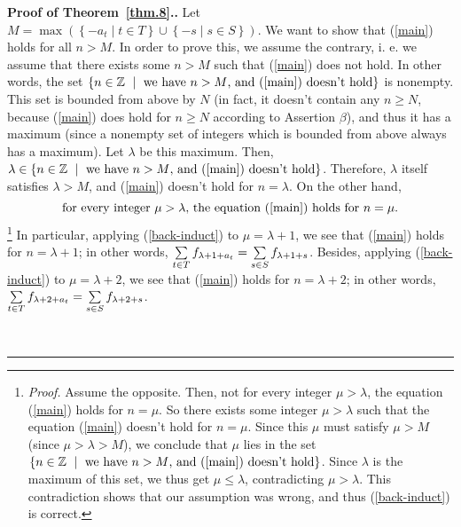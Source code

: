 \documentclass[numbers=enddot,12pt,final,onecolumn,notitlepage]{scrartcl}%
\numberwithin{exer}{section}
\theoremstyle{definition}
\newenvironment{proof}[1][Proof]{\noindent\textbf{#1.} }{\ \rule{0.5em}{0.5em}}
\let\sumnonlimits\sum
\renewcommand{\sum}{\sumnonlimits\limits}
\begin{document}
\begin{proof}[Proof of Theorem~\ref{thm.8}.]
Let $M=\max\left(  \left\{  -a_{t}\mid t\in T\right\}  \cup\left\{  -s\mid
s\in S\right\}  \right)  $. We want to show that (\ref{main}) holds for all
$n>M$. In order to prove this, we assume the contrary, i. e. we assume that
there exists some $n>M$ such that (\ref{main}) does not hold. In other words,
the set $\left\{  n\in\mathbb{Z}\ \mid\ \text{we have }n>M\text{, and
(\ref{main}) doesn't hold}\right\}  $ is nonempty. This set is bounded from
above by $N$ (in fact, it doesn't contain any $n\geq N$, because (\ref{main})
does hold for $n\geq N$ according to Assertion $\beta$), and thus it has a
maximum (since a nonempty set of integers which is bounded from above always
has a maximum). Let $\lambda$ be this maximum. Then, $\lambda\in\left\{
n\in\mathbb{Z}\ \mid\ \text{we have }n>M\text{, and (\ref{main}) doesn't
hold}\right\}  $. Therefore, $\lambda$ itself satisfies $\lambda>M$, and
(\ref{main}) doesn't hold for $n=\lambda$. On the other hand,%
\begin{equation}
\text{for every integer }\mu>\lambda\text{, the equation (\ref{main}) holds
for }n=\mu. \label{back-induct}%
\end{equation}
\footnote{\textit{Proof.} Assume the opposite. Then, not for every integer
$\mu>\lambda$, the equation (\ref{main}) holds for $n=\mu$. So there exists
some integer $\mu>\lambda$ such that the equation (\ref{main}) doesn't hold
for $n=\mu$. Since this $\mu$ must satisfy $\mu>M$ (since $\mu>\lambda>M$), we
conclude that $\mu$ lies in the set $\left\{  n\in\mathbb{Z}\ \mid\ \text{we
have }n>M\text{, and (\ref{main}) doesn't hold}\right\}  $. Since $\lambda$ is
the maximum of this set, we thus get $\mu\leq\lambda$, contradicting
$\mu>\lambda$. This contradiction shows that our assumption was wrong, and
thus (\ref{back-induct}) is correct.} In particular, applying
(\ref{back-induct}) to $\mu=\lambda+1$, we see that (\ref{main}) holds for
$n=\lambda+1$; in other words, $\sum\limits_{t\in T}f_{\lambda+1+a_{t}}%
=\sum\limits_{s\in S}f_{\lambda+1+s}$. Besides, applying (\ref{back-induct})
to $\mu=\lambda+2$, we see that (\ref{main}) holds for $n=\lambda+2$; in other
words, $\sum\limits_{t\in T}f_{\lambda+2+a_{t}}=\sum\limits_{s\in S}%
f_{\lambda+2+s}$.


\end{proof}
\end{document}
